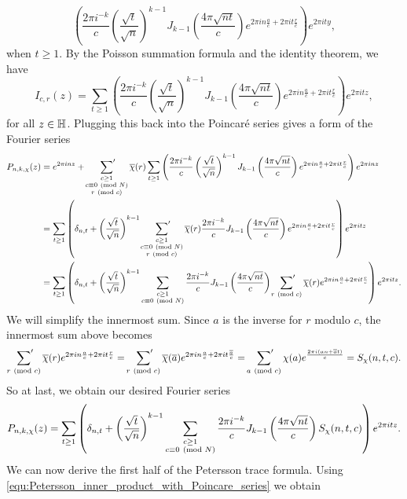     \[
      \left(\frac{2\pi i^{-k}}{c}\left(\frac{\sqrt{t}}{\sqrt{n}}\right)^{k-1}J_{k-1}\left(\frac{4\pi\sqrt{nt}}{c}\right)e^{2\pi in\frac{a}{c}+2\pi it\frac{r}{c}}\right)e^{2\pi ity},
    \]
    when $t \ge 1$. By the Poisson summation formula and the identity theorem, we have
    \[
      I_{c,r}(z) = \sum_{t \ge 1}\left(\frac{2\pi i^{-k}}{c}\left(\frac{\sqrt{t}}{\sqrt{n}}\right)^{k-1}J_{k-1}\left(\frac{4\pi\sqrt{nt}}{c}\right)e^{2\pi in\frac{a}{c}+2\pi it\frac{r}{c}}\right)e^{2\pi itz},
    \]
    for all $z \in \mathbb{H}$. Plugging this back into the Poincar\'e series gives a form of the Fourier series
    \begin{align*}
      P_{n,k,\chi}(z) &= e^{2\pi inz}+\sideset{}{'}\sum_{\substack{c \ge 1 \\ c \equiv 0 \ \left(\text{mod }N\right) \\ r \ \left(\text{mod }c\right)}}\overline{\chi}(r)\sum_{t \ge 1}\left(\frac{2\pi i^{-k}}{c}\left(\frac{\sqrt{t}}{\sqrt{n}}\right)^{k-1}J_{k-1}\left(\frac{4\pi\sqrt{nt}}{c}\right)e^{2\pi in\frac{a}{c}+2\pi it\frac{r}{c}}\right)e^{2\pi inz} \\
      &= \sum_{t \ge 1}\left(\delta_{n,t}+\left(\frac{\sqrt{t}}{\sqrt{n}}\right)^{k-1}\sideset{}{'}\sum_{\substack{c \ge 1 \\ c \equiv 0 \ \left(\text{mod }N\right) \\ r \ \left(\text{mod }c\right)}}\overline{\chi}(r)\frac{2\pi i^{-k}}{c}J_{k-1}\left(\frac{4\pi\sqrt{nt}}{c}\right)e^{2\pi in\frac{a}{c}+2\pi it\frac{r}{c}}\right)e^{2\pi itz} \\
      &= \sum_{t \ge 1}\left(\delta_{n,t}+\left(\frac{\sqrt{t}}{\sqrt{n}}\right)^{k-1}\sum_{\substack{c \ge 1 \\ c \equiv 0 \ \left(\text{mod }N\right)}}\frac{2\pi i^{-k}}{c}J_{k-1}\left(\frac{4\pi\sqrt{nt}}{c}\right)\sideset{}{'}\sum_{r \ \left(\text{mod }c\right)}\overline{\chi}(r)e^{2\pi in\frac{a}{c}+2\pi it\frac{r}{c}}\right)e^{2\pi itz}.
    \end{align*}
    We will simplify the innermost sum. Since $a$ is the inverse for $r$ modulo $c$, the innermost sum above becomes
    \[
      \sideset{}{'}\sum_{r \ \left(\text{mod }c\right)}\overline{\chi}(r)e^{2\pi in\frac{a}{c}+2\pi it\frac{r}{c}} = \sideset{}{'}\sum_{r \ \left(\text{mod }c\right)}\overline{\chi}(\overline{a})e^{2\pi in\frac{a}{c}+2\pi it\frac{\overline{a}}{c}} = \sideset{}{'}\sum_{a \ \left(\text{mod }c\right)}\chi(a)e^{\frac{2\pi i(an+\overline{a}t)}{c}} = S_{\chi}(n,t,c).
    \]
    So at last, we obtain our desired Fourier series
    \[
      P_{n,k,\chi}(z) = \sum_{t \ge 1}\left(\delta_{n,t}+\left(\frac{\sqrt{t}}{\sqrt{n}}\right)^{k-1}\sum_{\substack{c \ge 1 \\ c \equiv 0 \ \left(\text{mod }N\right)}}\frac{2\pi i^{-k}}{c}J_{k-1}\left(\frac{4\pi\sqrt{nt}}{c}\right)S_{\chi}(n,t,c)\right)e^{2\pi itz}.
    \]
    We can now derive the first half of the Petersson trace formula. Using \cref{equ:Petersson_inner_product_with_Poincare_series} we obtain
